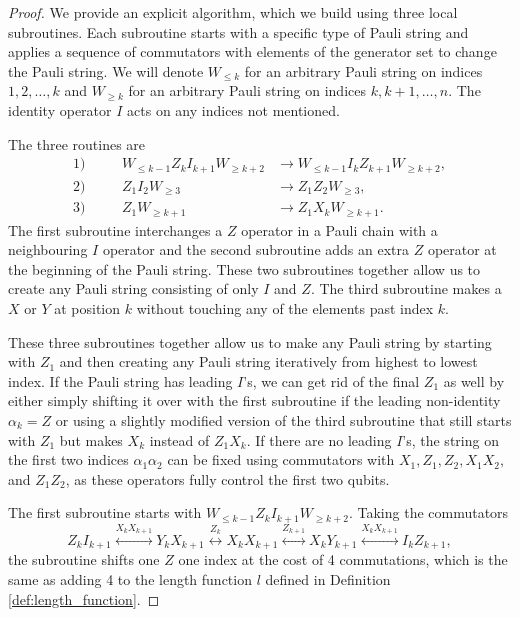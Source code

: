\documentclass[12pt, a4-paper]{amsart}
\numberwithin{equation}{section}
\begin{document}
\begin{proof}
We provide an explicit algorithm, which we build using three local subroutines. Each subroutine starts with a specific type of Pauli string and applies a sequence of commutators with elements of the generator set to change the Pauli string. We will denote $W_{\leq k}$ for an arbitrary Pauli string on indices $1,2,\ldots, k$ and $W_{\geq k}$ for an arbitrary Pauli string on indices $k, k+1, \ldots, n$. The identity operator $I$ acts on any indices not mentioned.

The three routines are
\begin{equation*}
\begin{aligned}
    1)&& \quad W_{\leq k-1} Z_k I_{k+1} W_{\geq k+2} &\to W_{\leq k-1} I_k Z_{k+1} W_{\geq k+2}, \\
    2)&& \quad Z_1 I_2 W_{\geq 3} & \to Z_1 Z_2 W_{\geq 3}, \\
    3) &&\quad Z_1 W_{\geq k+1} & \to Z_1 X_k W_{\geq k+1}.
\end{aligned}
\end{equation*}
The first subroutine interchanges a $Z$ operator in a Pauli chain with a neighbouring $I$ operator and the second subroutine adds an extra $Z$ operator at the beginning of the Pauli string. These two subroutines together allow us to create any Pauli string consisting of only $I$ and $Z$. The third subroutine makes a $X$ or $Y$ at position $k$ without touching any of the elements past index $k$.

These three subroutines together allow us to make any Pauli string by starting with $Z_1$ and then creating any Pauli string iteratively from highest to lowest index. If the Pauli string has leading $I$'s, we can get rid of the final $Z_1$ as well by either simply shifting it over with the first subroutine if the leading non-identity $\alpha_k = Z$ or using a slightly modified version of the third subroutine that still starts with $Z_1$ but makes $X_k$ instead of $Z_1 X_k$. If there are no leading $I$'s, the string on the first two indices $\alpha_1 \alpha_2$ can be fixed using commutators with $X_1, Z_1, Z_2, X_1 X_2,$ and $Z_1 Z_2$, as these operators fully control the first two qubits.

The first subroutine starts with $W_{\leq k-1} Z_k I_{k+1} W_{\geq k+2}$. Taking the commutators
\begin{equation}
    Z_k I_{k+1} \stackrel{X_k X_{k+1}}{\longleftrightarrow} Y_k X_{k+1} \stackrel{Z_k}{\longleftrightarrow} X_k X_{k+1} \stackrel{Z_{k+1}}{\longleftrightarrow}  X_k Y_{k+1} \stackrel{X_k X_{k+1}}{\longleftrightarrow} I_k Z_{k+1},
\end{equation}
the subroutine shifts one $Z$ one index at the cost of 4 commutations, which is the same as adding 4 to the length function $l$ defined in Definition \ref{def:length_function}.


\end{proof}
\end{document}
